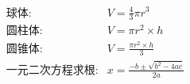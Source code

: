 \documentclass[UTF8,fontset=ubuntu]{ctexart}
\begin{document}
	\begin{align}
		\text{球体:} & V =\frac{4}{3}\pi r^3\\
		\text{圆柱体:} & V=\pi r^2\times h\\
		\text{圆锥体:} & V=\frac{\pi r^2\times h}{3}\\
		\text{一元二次方程求根:} & x=\frac{-b\pm\sqrt{b^2-4ac}}{2a}
	\end{align}
\end{document}

